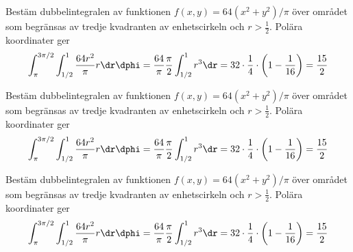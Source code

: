 Bestäm dubbelintegralen av funktionen $f(x, y) = 64(x^2 + y^2)/\pi$
över området \newline
som begränsas av tredje kvadranten av enhets\-cirkeln och $r > \tfrac12$.
Polära koordinater ger
\begin{align*}
  \int_{\pi}^{3\pi/2}\int_{1/2}^1 \frac{64r^2}{\pi} r\dr\dphi
  = \frac{64}{\pi}\frac{\pi}{2} \int_{1/2}^1 r^3\dr
  = 32 \cdot \frac{1}{4} \cdot \left(1 - \frac1{16}\right) = \frac{15}2
\end{align*}
%

Bestäm dubbelintegralen av funktionen $f(x, y) = 64(x^2 + y^2)/\pi$
över området \newline
som begränsas av tredje kvadranten av enhets\-cirkeln och $r > \tfrac12$.
Polära koordinater ger
\begin{align*}
  \int_{\pi}^{3\pi/2}\int_{1/2}^1 \frac{64r^2}{\pi} r\dr\dphi
  = \frac{64}{\pi}\frac{\pi}{2} \int_{1/2}^1 r^3\dr
  = 32 \cdot \frac{1}{4} \cdot \left(1 - \frac1{16}\right) = \frac{15}2
\end{align*}
%

Bestäm dubbelintegralen av funktionen $f(x, y) = 64(x^2 + y^2)/\pi$
över området \newline
som begränsas av tredje kvadranten av enhets\-cirkeln och $r > \tfrac12$.
Polära koordinater ger
\begin{align*}
  \int_{\pi}^{3\pi/2}\int_{1/2}^1 \frac{64r^2}{\pi} r\dr\dphi
  = \frac{64}{\pi}\frac{\pi}{2} \int_{1/2}^1 r^3\dr
  = 32 \cdot \frac{1}{4} \cdot \left(1 - \frac1{16}\right) = \frac{15}2
\end{align*}
%
